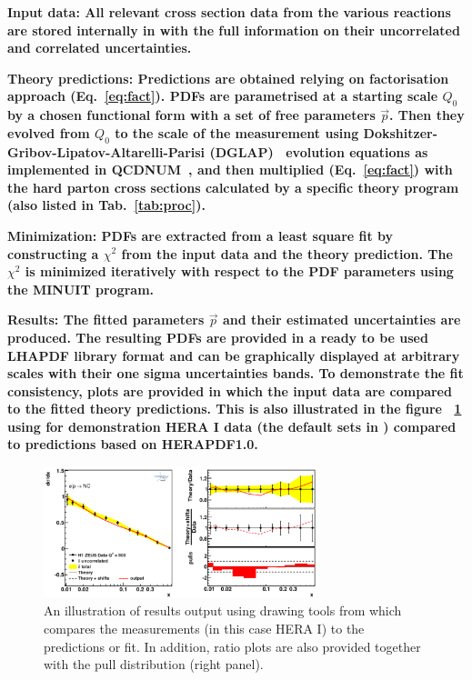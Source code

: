 \begin{description}
\item 
\bf {Input data:} \rm  All relevant cross section data from the various reactions
are stored internally in \fitter with the full information on their uncorrelated and correlated
uncertainties.
\item
\bf{Theory predictions:} \rm Predictions are obtained relying on factorisation approach (Eq.~\ref{eq:fact}). PDFs are parametrised at a starting scale $Q_0$  by a chosen functional form with a set of free parameters $\vec{p}$. Then they evolved from $Q_0$ to the scale of the measurement using 
Dokshitzer-Gribov-Lipatov-Altarelli-Parisi 
(DGLAP)~\cite{Gribov:1972ri, Gribov:1972rt, Lipatov:1974qm,
Dokshitzer:1977sg, Altarelli:1977zs} evolution equations 
as implemented in QCDNUM~\cite{qcdnum}, 
and then multiplied (Eq.~\ref{eq:fact}) with the hard parton cross sections calculated by
a specific theory program (also listed in Tab.~\ref{tab:proc}).
\item
\bf{Minimization:} \rm  PDFs are extracted from a least square fit by constructing a 
$\chi^2$ from the input data and the theory prediction.
The $\chi^2$ is  minimized iteratively 
with respect to the PDF parameters using the MINUIT\cite{minuit} program.
%
%
\item
\bf{Results:} \rm  The fitted parameters $\vec{p}$ and their estimated uncertainties are produced.
The resulting PDFs are provided in a ready to be used LHAPDF library format
and can be graphically 
displayed at arbitrary scales with their one sigma uncertainties bands.
To demonstrate the fit consistency, plots are provided 
in which the input data are compared to the fitted theory predictions. This is also illustrated in the figure ~\ref{fig:data} using for demonstration HERA I data (the default sets in \fitter) compared to predictions based on HERAPDF1.0\cite{h1zeus:2009wt}.  
\begin{figure}[!ht]
   \centering
   \includegraphics[width=8cm]{datatheory.pdf}
   \caption{An illustration of results output using drawing tools from \fitter which compares the measurements (in this case HERA I) to the predictions or fit. In addition, ratio plots are also provided together with the pull distribution (right panel).} 
 \label{fig:data}
\end{figure}

\end{description}
